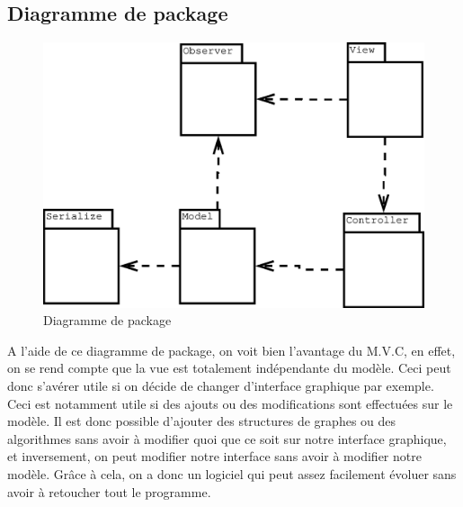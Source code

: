 \documentclass[11pt,a4paper]{article}
\begin{document}
		\subsection{Diagramme de package}
			\begin{figure}[htbp]
				\begin{center}
					\includegraphics[scale=0.5]{packages.eps}
				\end{center}
				\caption{Diagramme de package}
				\label{img_package}
			\end{figure}
			A l'aide de ce diagramme de package, on voit bien l'avantage du M.V.C, en effet, on se rend compte que la vue est totalement indépendante du modèle. Ceci peut donc s'avérer utile si on décide de changer d'interface graphique par exemple. Ceci est notamment utile si des ajouts ou des modifications sont effectuées sur le modèle. Il est donc possible d'ajouter des structures de graphes ou des algorithmes sans avoir à modifier quoi que ce soit sur notre interface graphique, et inversement, on peut modifier notre interface sans avoir à modifier notre modèle. Grâce à cela, on a donc un logiciel qui peut assez facilement évoluer sans avoir à retoucher tout le programme.
	
	\newpage
\end{document}
